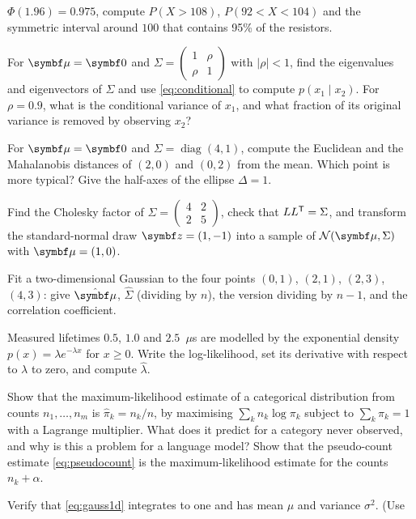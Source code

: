 \documentclass[11pt]{article}
\begin{document}
\begin{questions}
\begin{calculations}
$\Phi(1.96) = 0.975$, compute $P(X > 108)$, $P(92 < X < 104)$ and the symmetric interval around $100$ that contains
95\% of the resistors.
\item For $\vmu = \vect{0}$ and $\Sigma = \begin{pmatrix} 1 & \rho \\ \rho & 1 \end{pmatrix}$ with $\lvert\rho\rvert <
1$, find the eigenvalues and eigenvectors of $\Sigma$ and use \eqref{eq:conditional} to compute $p(x_1 \mid x_2)$. For
$\rho = 0.9$, what is the conditional variance of $x_1$, and what fraction of its original variance is removed by
observing $x_2$?
\item For $\vmu = \vect{0}$ and $\Sigma = \operatorname{diag}(4, 1)$, compute the Euclidean and the Mahalanobis
distances of $(2, 0)$ and $(0, 2)$ from the mean. Which point is more typical? Give the half-axes of the ellipse
$\Delta = 1$.
\item Find the Cholesky factor of $\Sigma = \begin{pmatrix} 4 & 2 \\ 2 & 5 \end{pmatrix}$, check that $LL^{\mathsf{T}} = \Sigma$,
and transform the standard-normal draw $\vect{z} = (1, -1)$ into a sample of $\Normal(\vmu, \Sigma)$ with
$\vmu = (1, 0)$.
\item Fit a two-dimensional Gaussian to the four points $(0, 1)$, $(2, 1)$, $(2, 3)$, $(4, 3)$: give $\hat{\vmu}$,
$\hat\Sigma$ (dividing by $n$), the version dividing by $n - 1$, and the correlation coefficient.
\item Measured lifetimes $0.5$, $1.0$ and $2.5$~$\mu$s are modelled by the exponential density $p(x) =
\lambda e^{-\lambda x}$ for $x \ge 0$. Write the log-likelihood, set its derivative with respect to $\lambda$ to zero,
and compute $\hat\lambda$.
\end{calculations}
\begin{derivations}
\item Show that the maximum-likelihood estimate of a categorical distribution from counts $n_1, \dots, n_m$ is
$\hat\pi_k = n_k / n$, by maximising $\sum_k n_k \log \pi_k$ subject to $\sum_k \pi_k = 1$ with a Lagrange multiplier.
What does it predict for a category never observed, and why is this a problem for a language model? Show that the
pseudo-count estimate \eqref{eq:pseudocount} is the maximum-likelihood estimate for the counts $n_k + \alpha$.
\item Verify that \eqref{eq:gauss1d} integrates to one and has mean $\mu$ and variance $\sigma^2$. (Use

\end{derivations}
\end{questions}
\end{document}
